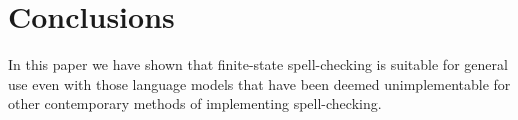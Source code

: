 \documentclass[11pt]{article}
\begin{document}
\section{Conclusions}
\label{sec:conclusions}

In this paper we have shown that finite-state spell-checking is suitable for
general use even with those language models that have been deemed
unimplementable for other contemporary methods of implementing spell-checking.





\end{document}
